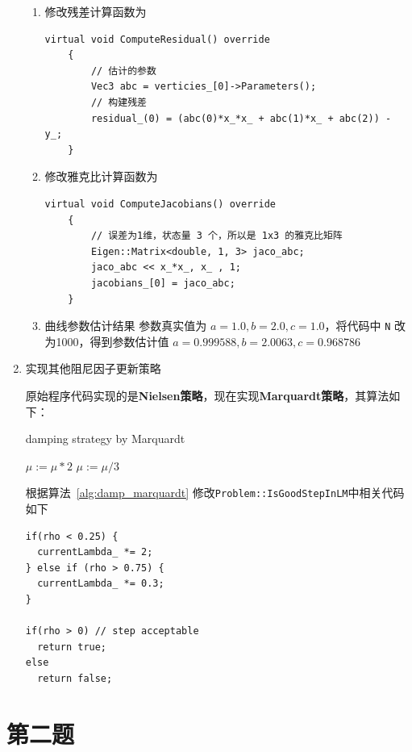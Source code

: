 \documentclass[12pt,a4paper,utf8]{article}
\begin{document}
\begin{enumerate}
\begin{enumerate}
	\item 修改残差计算函数为
	\begin{lstlisting}[frame=shadowbox]
	virtual void ComputeResidual() override
	{
		// 估计的参数
		Vec3 abc = verticies_[0]->Parameters();  
		// 构建残差
		residual_(0) = (abc(0)*x_*x_ + abc(1)*x_ + abc(2)) - y_;  
	}
	\end{lstlisting}
	
	\item 修改雅克比计算函数为
	\begin{lstlisting}[frame=shadowbox]
	virtual void ComputeJacobians() override
	{
		// 误差为1维，状态量 3 个，所以是 1x3 的雅克比矩阵
		Eigen::Matrix<double, 1, 3> jaco_abc;  
		jaco_abc << x_*x_, x_ , 1;
		jacobians_[0] = jaco_abc;
	}
	\end{lstlisting}
	
	\item 曲线参数估计结果
	参数真实值为 $a=1.0, b=2.0, c=1.0$，将代码中 \verb|N| 改为1000，得到参数估计值 $a=0.999588, b=2.0063, c=0.968786$
	
\end{enumerate}

\item 实现其他阻尼因子更新策略

原始程序代码实现的是\textbf{Nielsen策略}，现在实现\textbf{Marquardt策略}\cite{madsen1999methods}，其算法如下：

\begin{algorithm}[H]
	\label{alg:damp_marquardt}
	\caption{damping strategy by Marquardt}
	\begin{algorithmic}[1]
		\STATE $\mu := \mu * 2$
		\STATE $\mu := \mu / 3$
		\ENDIF 
	\end{algorithmic}
\end{algorithm}

根据算法~\ref{alg:damp_marquardt} 修改\verb|Problem::IsGoodStepInLM|中相关代码如下

\begin{lstlisting}[frame=shadowbox]
if(rho < 0.25) {
  currentLambda_ *= 2;
} else if (rho > 0.75) {
  currentLambda_ *= 0.3;
}

if(rho > 0) // step acceptable
  return true;
else
  return false;
\end{lstlisting}

\end{enumerate}


\section*{第二题}
\end{document}
